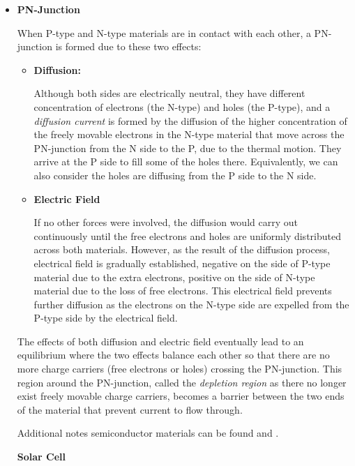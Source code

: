 \documentclass{article}
\begin{document}
\begin{itemize}
\item {\bf PN-Junction}

When P-type and N-type materials are in contact with each other, a 
PN-junction is formed due to these two effects:
\begin{itemize}
\item {\bf Diffusion:}

Although both sides are electrically neutral, they have different
concentration of electrons (the N-type) and holes (the P-type), and 
a {\em diffusion current} is formed by the diffusion of the higher
concentration of the freely movable electrons in the N-type material 
that move across the PN-junction from the N side to the P, due to the
thermal motion. They arrive at the P side to fill some of the holes
there. Equivalently, we can also consider the holes are diffusing
from the P side to the N side.

\item {\bf Electric Field}

If no other forces were involved, the diffusion would carry out 
continuously until the free electrons and holes are uniformly distributed
across both materials. However, as the result of the diffusion process,
electrical field is gradually established, negative on the side of P-type 
material due to the extra electrons, positive on the side of N-type 
material due to the loss of free electrons. This electrical field prevents
further diffusion as the electrons on the N-type side are expelled from
the P-type side by the electrical field.

\end{itemize}



The effects of both diffusion and electric field eventually lead to an 
equilibrium where the two effects balance each other so that there are
no more charge carriers (free electrons or holes) crossing the PN-junction.
This region around the PN-junction, called the {\em depletion region} as 
there no longer exist freely movable charge carriers, becomes a barrier 
between the two ends of the material that prevent current to flow through.

Additional notes semiconductor materials can be found
 and
.

{\bf Solar Cell}


\end{itemize}
\end{document}
